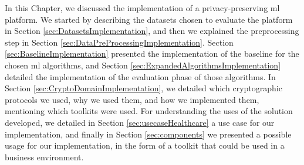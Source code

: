 In this Chapter, we discussed the implementation of a privacy-preserving \ac{ml} platform. We started by describing the datasets chosen to evaluate the platform in Section \ref{sec:DatasetsImplementation}, and then we explained the preprocessing step in Section \ref{sec:DataPreProcessingImplementation}.
Section \ref{sec:BaselineImplementation} presented the implementation of the baseline for the chosen \ac{ml} algorithms, and Section \ref{sec:ExpandedAlgorithmsImplementation} detailed the implementation of the evaluation phase of those algorithms.
In Section \ref{sec:CryptoDomainImplementation}, we detailed which cryptographic protocols we used, why we used them, and how we implemented them, mentioning which toolkits were used.
For understanding the uses of the solution developed, we detailed in Section \ref{sec:usecaseHealthcare} a use case for our implementation, and finally in Section \ref{sec:components} we presented a possible usage for our implementation, in the form of a toolkit that could be used in a business environment.


